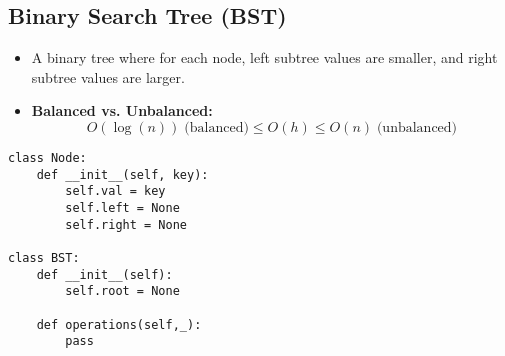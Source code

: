 \subsection{Binary Search Tree (BST)}
\begin{summary}
    \begin{itemize}
        \item A binary tree where for each node, left subtree values are smaller, and right subtree values are larger.
        \item \textbf{Balanced vs. Unbalanced:} 
            \begin{equation*}
                O(\log (n)) \; \text{(balanced)} \leq O(h) \leq O(n) \; \text{(unbalanced)}
            \end{equation*}
    \end{itemize}
\end{summary}

\begin{algo}
\begin{lstlisting}
class Node:
    def __init__(self, key):
        self.val = key
        self.left = None
        self.right = None

class BST:
    def __init__(self):
        self.root = None

    def operations(self,_):
        pass
\end{lstlisting}
\end{algo}

